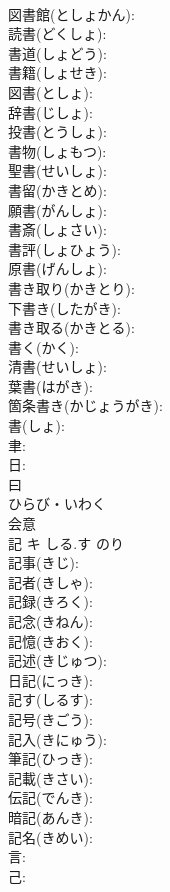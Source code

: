 \documentclass[8pt]{extreport}
\begin{document}
\begin{CJK}{UTF8}{min}
\\	図書館(としょかん): 
\\	読書(どくしょ): 
\\	書道(しょどう): 
\\	書籍(しょせき): 
\\	図書(としょ): 
\\	辞書(じしょ): 
\\	投書(とうしょ): 
\\	書物(しょもつ): 
\\	聖書(せいしょ): 
\\	書留(かきとめ): 
\\	願書(がんしょ): 
\\	書斎(しょさい): 
\\	書評(しょひょう): 
\\	原書(げんしょ): 
\\	書き取り(かきとり): 
\\	下書き(したがき): 
\\	書き取る(かきとる): 
\\	書く(かく): 
\\	清書(せいしょ): 
\\	葉書(はがき): 
\\	箇条書き(かじょうがき): 
\\	書(しょ): 
\\	聿: 
\\	日: 
\\	曰	
\\	ひらび・いわく	
\\	会意 
\\	記	キ	しる.す	のり	
\\	記事(きじ): 
\\	記者(きしゃ): 
\\	記録(きろく): 
\\	記念(きねん): 
\\	記憶(きおく): 
\\	記述(きじゅつ): 
\\	日記(にっき): 
\\	記す(しるす): 
\\	記号(きごう): 
\\	記入(きにゅう): 
\\	筆記(ひっき): 
\\	記載(きさい): 
\\	伝記(でんき): 
\\	暗記(あんき): 
\\	記名(きめい): 
\\	言: 
\\	己: 

\end{CJK}
\end{document}
